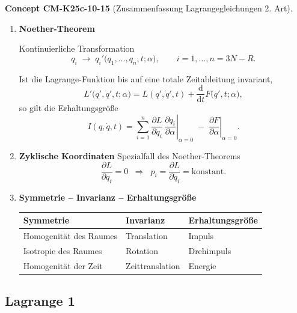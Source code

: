 \documentclass[10pt, letterpaper]{article}
\newcommand{\CustomHeading}[3]{%
  \par\medskip\noindent%
  \textbf{#1 #2} \textnormal{(#3)}.\enskip%
}
\newenvironment{CONC}[2]{\CustomHeading{Concept}{#1}{#2}}{}
\begin{document}
\begin{CONC}{CM-K25c-10-15}{Zusammenfassung Lagrangegleichungen 2. Art}
\begin{enumerate}
  \item \textbf{Noether-Theorem}

        Kontinuierliche Transformation
        \[
          q_i \;\longrightarrow\;
          q_i'\bigl(q_1,\dots,q_n,t;\alpha\bigr),
          \qquad i=1,\dots,n=3N-R.
        \]

        Ist die Lagrange-Funktion bis auf eine totale Zeitableitung invariant,
        \[
          L'\bigl(q',\dot q',t;\alpha\bigr)
          = L(q',\dot q',t)
            +\frac{\mathrm d}{\mathrm dt}F\bigl(q',t;\alpha\bigr),
        \]
        so gilt die Erhaltungsgröße
        \[
          I(q,\dot q,t)
          = \sum_{i=1}^{n}
              \frac{\partial L}{\partial\dot q_i}\,
              \left.
                \frac{\partial q_i}{\partial\alpha}
              \right|_{\alpha=0}
            \;-\;
            \left.
              \frac{\partial F}{\partial\alpha}
            \right|_{\alpha=0}.
        \]

  \item \textbf{Zyklische Koordinaten}  
        Spezialfall des Noether-Theorems  
        \[
          \frac{\partial L}{\partial q_i}=0
          \;\;\Longrightarrow\;\;
          p_i=\frac{\partial L}{\partial\dot q_i}
          =\text{konstant}.
        \]

  \item \textbf{Symmetrie – Invarianz – Erhaltungsgröße}

        \begin{center}
        \begin{tabular}{|l|l|l|}
          \hline
          \textbf{Symmetrie} & \textbf{Invarianz} & \textbf{Erhaltungsgröße} \\ \hline
          Homogenität des Raumes        & Translation & Impuls \\ \hline
          Isotropie des Raumes          & Rotation    & Drehimpuls \\ \hline
          Homogenität der Zeit          & Zeittranslation & Energie \\ \hline
        \end{tabular}
        \end{center}
\end{enumerate}
\end{CONC}

\subsection{Lagrange 1}
\end{document}
